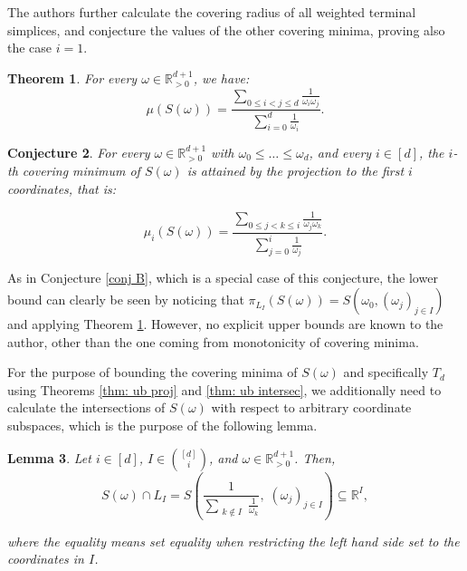\documentclass{amsart}
\newtheorem{theorem}{Theorem}[section]
\newtheorem{lemma}[theorem]{Lemma}
\newtheorem{conjecture}[theorem]{Conjecture}
\theoremstyle{definition}
\theoremstyle{remark}
\newcommand{\R}{\mathbb{R}}
\begin{document}
The authors further calculate the covering radius of all weighted terminal simplices, and conjecture the values of the other covering minima, proving also the case $i=1$.

\begin{theorem}\label{thm: cr simplices}
{\cite[Theorem 1.4]{CodenottiSantosSchymura}}
For every $\omega \in \R^{d+1}_{>0}$, we have:
$$\mu(S(\omega))=\frac{\sum\limits_{0\leqslant i<j\leqslant d}\frac{1}{\omega_i \omega_j}}{\sum\limits_{i=0}^d \frac{1}{\omega_i}}.$$
\end{theorem}

\begin{conjecture}\cite[Conj. 5.3]{CodenottiSantosSchymura} \label{conj: cm weighted}
For every $\omega\in \R^{d+1}_{>0}$ with $\omega_0\leqslant\dots\leqslant \omega_d$, and every $i\in [d]$, the $i$-th covering minimum of $S(\omega)$ is attained by the projection to the first $i$ coordinates, that is:

$$\mu_i(S(\omega))=\frac{\sum\limits_{0\leqslant j<k\leqslant i}\frac{1}{\omega_j \omega_k}}{\sum\limits_{j=0}^i \frac{1}{\omega_j}}.$$
\end{conjecture}

As in Conjecture \ref{conj B}, which is a special case of this conjecture, the lower bound can clearly be seen by noticing that $\pi_{L_I}(S(\omega))=S(\omega_0, (\omega_j)_{j\in I})$ and applying Theorem \ref{thm: cr simplices}. However, no explicit upper bounds are known to the author, other than the one coming from monotonicity of covering minima.


For the purpose of bounding the covering minima of $S(\omega)$ and specifically $T_d$ using Theorems  \ref{thm: ub proj} and \ref{thm: ub intersec}, we additionally need to calculate the intersections of $S(\omega)$ with respect to arbitrary coordinate subspaces, which is the purpose of the following lemma. 


\begin{lemma} \label{lem: weighted}
Let $i\in [d]$, $I\in {{[d]}\choose i}$, and $\omega\in \R^{d+1}_{>0}$. Then,
$$
S(\omega)\cap L_I
=
S\left(
\frac{1}{\sum\limits_{\substack{k \notin I}} \frac{1}{\omega_k}},\;
(\omega_j)_{j\in I}
\right)\subseteq \R^I,
$$

\noindent where the equality means set equality when restricting the left hand side set to the coordinates in $I$.
\end{lemma}
\end{document}
